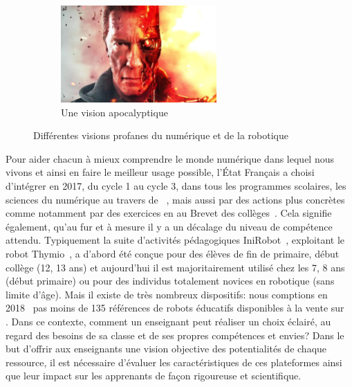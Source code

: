 \begin{figure}[!h]
\begin{subfigure}{0.39\linewidth}
        \includegraphics[width=0.975\linewidth]{Figures/bot-fear.png}
        \caption{\label{fig:bot-fear} Une vision apocalyptique}
    \end{subfigure}
    \caption{\label{fig:bot-vision} Différentes visions profanes du numérique et de la robotique}
    \end{figure}{}\par%
    Pour aider chacun à mieux comprendre le monde numérique dans lequel nous vivons et ainsi en faire le meilleur usage possible, l'État Français a choisi d'intégrer en 2017, du cycle 1 au cycle 3, dans tous les programmes scolaires, les sciences du numérique au travers de ~, mais aussi par des actions plus concrètes comme notamment par des exercices en  au Brevet des collèges~. 
    Cela signifie également, qu'au fur et à mesure il y a un décalage du niveau de compétence attendu.
    Typiquement la suite d'activités pédagogiques IniRobot~, exploitant le robot Thymio~, a d'abord été conçue pour des élèves de fin de primaire, début collège (12, 13 ans) et aujourd'hui il est majoritairement utilisé chez les 7, 8 ans (début primaire) ou pour des individus totalement novices en robotique (sans limite d'âge).
    Mais il existe de très nombreux dispositifs: nous comptions en 2018~ pas moins de 135 références de robots éducatifs disponibles à la vente sur ~ .
    Dans ce contexte, comment un enseignant peut réaliser un choix éclairé, au regard des besoins de sa classe et de ses propres compétences et envies?
    Dans le but d'offrir aux enseignants une vision objective des potentialités de chaque ressource, il est nécessaire d'évaluer les caractéristiques de ces plateformes ainsi que leur impact sur les apprenants de façon rigoureuse et scientifique.\par%
